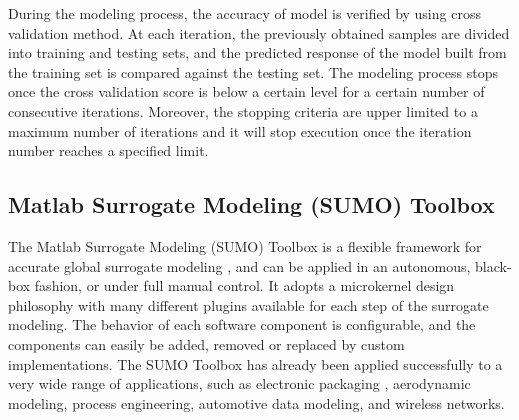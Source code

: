 During the modeling process, the accuracy of model is verified by using cross validation method. At each iteration, the previously obtained samples are divided into training and testing sets, and the predicted response of the model built from the training set is compared against the testing set. The modeling process stops once the cross validation score is below a certain level for a certain number of consecutive iterations. Moreover, the stopping criteria are upper limited to a maximum number of iterations and it will stop execution once the iteration number reaches a specified limit.








% 

\subsection{Matlab Surrogate Modeling (SUMO) Toolbox}

The Matlab Surrogate Modeling (SUMO) Toolbox is a flexible framework for accurate global surrogate modeling \cite{SUMOtoolbox2010}, and can be applied in an autonomous, black-box fashion, or under full manual control. It adopts a microkernel design philosophy with many different plugins available for each step of the surrogate modeling. The behavior of each software component is configurable, and the components can easily be added, removed or replaced by custom implementations. The SUMO Toolbox has already been applied successfully to a very wide range of applications, such as electronic packaging , aerodynamic modeling, process engineering, automotive data modeling, and wireless networks.


